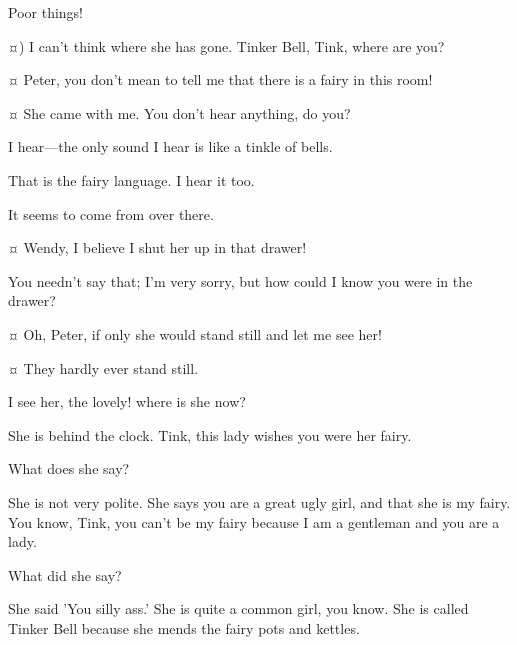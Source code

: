 \begin{drama}
\wendyspeaks
Poor things!

\peterspeaks {}¤)
I can't think where she has gone.
Tinker Bell, Tink, where are you?

\wendyspeaks {}¤
Peter, you don't mean to tell me that there is a fairy in this room!

\peterspeaks {}¤
She came with me.
You don't hear anything, do you?

\wendyspeaks
I hear—the only sound I hear is like a tinkle of bells.

\peterspeaks
That is the fairy language.
I hear it too.

\wendyspeaks
It seems to come from over there.

\peterspeaks
{}¤
Wendy, I believe I shut her up in that drawer!


\speakercontinues
You needn't say that; I'm very sorry, but how could I know you were in the drawer?

\wendyspeaks {}¤
Oh, Peter, if only she would stand still and let me see her!

\peterspeaks {}¤
They hardly ever stand still.


\wendyspeaks
I see her, the lovely!
where is she now?

\peterspeaks
She is behind the clock.
Tink, this lady wishes you were her fairy.

\wendyspeaks
What does she say?

\peterspeaks
She is not very polite.
She says you are a great ugly girl, and that she is my fairy.
You know, Tink, you can't be my fairy because I am a gentleman and you are a lady.


\wendyspeaks
What did she say?

\peterspeaks
She said 'You silly ass.'
She is quite a common girl, you know.
She is called Tinker Bell because she mends the fairy pots and kettles.



\end{drama}
